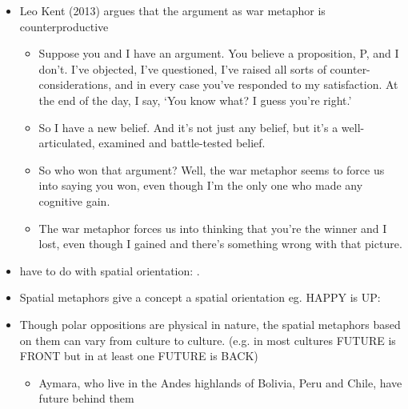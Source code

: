\documentclass[headrule,footrule]{foils}
\begin{document}
\begin{itemize}
\item Leo Kent (2013) argues that the argument as war metaphor is counterproductive
  \begin{itemize}
  \item Suppose you and I have an argument. You believe a proposition, P, and I don’t. I’ve objected, I’ve questioned, I’ve raised all sorts of counter-considerations, and in every case you’ve responded to my satisfaction. At the end of the day, I say, ‘You know what? I guess you’re right.’
  \item So I have a new belief. And it’s not just any belief, but it’s a well-articulated, examined and battle-tested belief.
  \item So who won that argument? Well, the war metaphor seems to force us into saying you won, even though I’m the only one who made any cognitive gain.
  \item The war metaphor forces us into thinking that you’re the winner and I lost, even though I gained and there’s something wrong with that picture.
  \end{itemize}
  
\end{itemize}



\begin{itemize}
\item {} have to do with
spatial orientation: .

\item Spatial metaphors give a concept a spatial orientation eg.
HAPPY is UP: 
\item Though polar oppositions  are physical in nature, the spatial
metaphors based on them can vary from culture to culture. (e.g. in most 
cultures FUTURE is FRONT but in at least one FUTURE is BACK)
\begin{itemize}
\item Aymara, who live in the Andes highlands of Bolivia, Peru and
  Chile, have future behind them
\end{itemize}
\end{itemize}

\begin{exe}
\ex {}
\ex {}
\ex {}
\ex {}
\ex {}
\ex {}
\ex {}
\ex {}
\ex {}
\ex {}
\end{exe}
\end{document}
